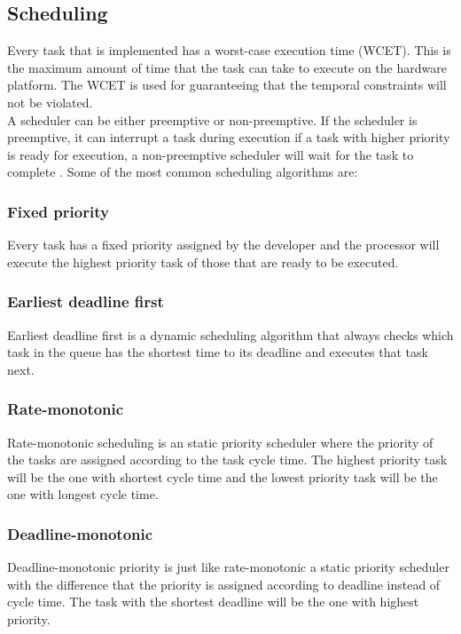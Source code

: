 \subsection{Scheduling}
Every task that is implemented has a worst-case execution time (WCET). This is the maximum amount of time that the task can take to execute on the hardware platform. The WCET is used for guaranteeing that the temporal constraints will not be violated.\\

A scheduler can be either preemptive or non-preemptive. If the scheduler is preemptive, it can interrupt a task during execution if a task with higher priority is ready for execution, a non-preemptive scheduler will wait for the task to complete \cite{RTSS}. Some of the most common scheduling algorithms are:

\subsubsection{Fixed priority}
Every task has a fixed priority assigned by the developer and the processor will execute the highest priority task of those that are ready to be executed. 
\subsubsection{Earliest deadline first}
Earliest deadline first is a dynamic scheduling algorithm that always checks which task in the queue has the shortest time to its deadline and executes that task next.
\subsubsection{Rate-monotonic}
Rate-monotonic scheduling is an static priority scheduler where the priority of the tasks are assigned according to the task cycle time. The highest priority task will be the one with shortest cycle time and the lowest priority task will be the one with longest cycle time.
\subsubsection{Deadline-monotonic}
Deadline-monotonic priority is just like rate-monotonic a static priority scheduler with the difference that the priority is assigned according to deadline instead of cycle time. The task with the shortest deadline will be the one with highest priority.